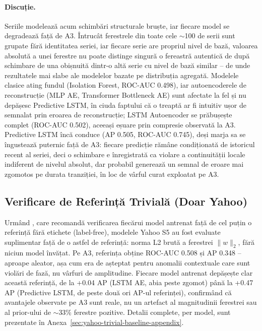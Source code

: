 \paragraph{Discuție.} Seriile modelează acum schimbări structurale bruște, iar fiecare model se degradează față de A3. Întrucât ferestrele din toate cele $\sim$100 de serii sunt grupate fără identitatea seriei, iar fiecare serie are propriul nivel de bază, valoarea absolută a unei ferestre nu poate distinge singură o fereastră autentică de după schimbare de una obișnuită dintr-o altă serie cu nivel de bază similar -- de unde rezultatele mai slabe ale modelelor bazate pe distribuția agregată. Modelele clasice ating fundul (Isolation Forest, ROC-AUC 0.498), iar autoencoderele de reconstrucție (MLP AE, Transformer Bottleneck AE) sunt afectate la fel și nu depășesc Predictive LSTM, în ciuda faptului că o treaptă ar fi intuitiv ușor de semnalat prin eroarea de reconstrucție; LSTM Autoencoder se prăbușește complet (ROC-AUC 0.502), aceeași eșuare prin compresie observată la A3.
Predictive LSTM încă conduce (AP 0.505, ROC-AUC 0.745), deși marja sa se îngustează puternic față de A3: fiecare predicție rămâne condiționată de istoricul recent al seriei, deci o schimbare e înregistrată ca violare a continuității locale indiferent de nivelul absolut, dar probabil generează un semnal de eroare mai zgomotos pe durata tranziției, în loc de vârful curat exploatat pe A3.

\subsection{Verificare de Referință Trivială (Doar Yahoo)}
\label{sec:yahoo-trivial-baseline}

Urmând \textcite{kim2022rigorous}, care recomandă verificarea fiecărui model antrenat față de cel puțin o referință fără etichete (label-free), modelele Yahoo S5 au fost evaluate suplimentar față de o astfel de referință: norma L2 brută a ferestrei $\lVert w \rVert_2$, fără niciun model învățat.
Pe A3, referința obține ROC-AUC 0.508 și AP 0.348 -- aproape aleator, așa cum era de așteptat pentru anomalii contextuale care sunt violări de fază, nu vârfuri de amplitudine. Fiecare model antrenat depășește clar această referință, de la +0.04 AP (LSTM AE, abia peste zgomot) până la +0.47 AP (Predictive LSTM, de peste două ori AP-ul referinței), confirmând că avantajele observate pe A3 sunt reale, nu un artefact al magnitudinii ferestrei sau al prior-ului de $\sim$33\% ferestre pozitive. Detalii complete, per model, sunt prezentate în Anexa~\ref{sec:yahoo-trivial-baseline-appendix}.

